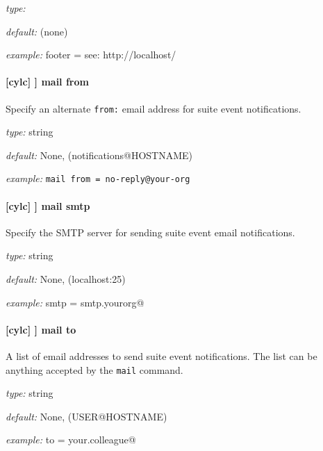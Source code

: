 \begin{myitemize}
    \item {\em type:} 
    \item {\em default:} (none)
    \item {\em example:} \lstinline@mail footer = see: http://localhost/%(owner)s/notes-on/%(suite)s/@
\end{myitemize}

\paragraph[mail from]{[cylc] \textrightarrow [[events]] \textrightarrow mail from}

Specify an alternate \lstinline=from:= email address for suite event notifications.

\begin{myitemize}
    \item {\em type:} string
    \item {\em default:} None, (notifications@HOSTNAME)
    \item {\em example:} \lstinline|mail from = no-reply@your-org|
\end{myitemize}

\paragraph[mail smtp]{[cylc] \textrightarrow [[events]] \textrightarrow mail smtp}

Specify the SMTP server for sending suite event email notifications.

\begin{myitemize}
    \item {\em type:} string
    \item {\em default:} None, (localhost:25)
    \item {\em example:} \lstinline@mail smtp = smtp.yourorg@
\end{myitemize}

\paragraph[mail to]{[cylc] \textrightarrow [[events]] \textrightarrow mail to}

A list of email addresses to send suite event notifications. The list can be
anything accepted by the \lstinline=mail= command.

\begin{myitemize}
    \item {\em type:} string
    \item {\em default:} None, (USER@HOSTNAME)
    \item {\em example:} \lstinline@mail to = your.colleague@
\end{myitemize}

